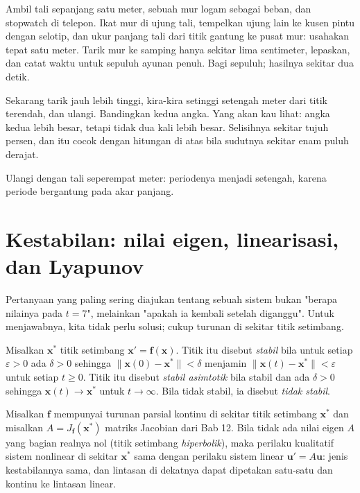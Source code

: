 \begin{tangan}
Ambil tali sepanjang satu meter, sebuah mur logam sebagai beban, dan stopwatch
di telepon. Ikat mur di ujung tali, tempelkan ujung lain ke kusen pintu dengan
selotip, dan ukur panjang tali dari titik gantung ke pusat mur: usahakan tepat
satu meter. Tarik mur ke samping hanya sekitar lima sentimeter, lepaskan, dan
catat waktu untuk sepuluh ayunan penuh. Bagi sepuluh; hasilnya sekitar dua
detik.

Sekarang tarik jauh lebih tinggi, kira-kira setinggi setengah meter dari titik
terendah, dan ulangi. Bandingkan kedua angka. Yang akan kau lihat: angka kedua
lebih besar, tetapi tidak dua kali lebih besar. Selisihnya sekitar tujuh persen,
dan itu cocok dengan hitungan di atas bila sudutnya sekitar enam puluh derajat.

Ulangi dengan tali seperempat meter: periodenya menjadi setengah, karena
periode bergantung pada akar panjang.
\end{tangan}

\section{Kestabilan: nilai eigen, linearisasi, dan Lyapunov}

Pertanyaan yang paling sering diajukan tentang sebuah sistem bukan "berapa
nilainya pada $t=7$", melainkan "apakah ia kembali setelah diganggu". Untuk
menjawabnya, kita tidak perlu solusi; cukup turunan di sekitar titik setimbang.

\begin{definisi}[Kestabilan]
Misalkan $\mathbf{x}^{*}$ titik setimbang $\mathbf{x}'=\mathbf{f}(\mathbf{x})$.
Titik itu disebut \emph{stabil} bila untuk setiap $\varepsilon>0$ ada
$\delta>0$ sehingga $\|\mathbf{x}(0)-\mathbf{x}^{*}\|<\delta$ menjamin
$\|\mathbf{x}(t)-\mathbf{x}^{*}\|<\varepsilon$ untuk setiap $t\ge0$. Titik itu
disebut \emph{stabil asimtotik} bila stabil dan ada $\delta>0$ sehingga
$\mathbf{x}(t)\to\mathbf{x}^{*}$ untuk $t\to\infty$. Bila tidak stabil, ia
disebut \emph{tidak stabil}.
\end{definisi}

\begin{teorema}[Linearisasi]
Misalkan $\mathbf{f}$ mempunyai turunan parsial kontinu di sekitar titik
setimbang $\mathbf{x}^{*}$ dan misalkan $A=J_{\mathbf{f}}(\mathbf{x}^{*})$
matriks Jacobian dari Bab 12. Bila tidak ada nilai eigen $A$ yang bagian
realnya nol (titik setimbang \emph{hiperbolik}), maka perilaku kualitatif sistem
nonlinear di sekitar $\mathbf{x}^{*}$ sama dengan perilaku sistem linear
$\mathbf{u}'=A\mathbf{u}$: jenis kestabilannya sama, dan lintasan di dekatnya
dapat dipetakan satu-satu dan kontinu ke lintasan linear.
\end{teorema}

